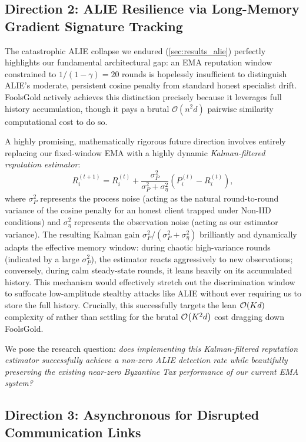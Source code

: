 \documentclass[../main.tex]{subfiles}
\begin{document}
\subsection{Direction 2: ALIE Resilience via Long-Memory Gradient Signature Tracking}
\label{sec:future_alie}

The catastrophic ALIE collapse we endured (\cref{sec:results_alie}) perfectly highlights our fundamental architectural gap: an EMA reputation window constrained to $1/(1-\gamma) = 20$ rounds is hopelessly insufficient to distinguish ALIE's moderate, persistent cosine penalty from standard honest specialist drift. FoolsGold actively achieves this distinction precisely because it leverages full history accumulation, though it pays a brutal $\mathcal{O}(n^2 d)$ pairwise similarity computational cost to do so.

A highly promising, mathematically rigorous future direction involves entirely replacing our fixed-window EMA with a highly dynamic \emph{Kalman-filtered reputation estimator}:
\begin{equation}
    R_i^{(t+1)} = R_i^{(t)} + \frac{\sigma_P^2}{\sigma_P^2 + \sigma_\eta^2}\left(P_i^{(t)} - R_i^{(t)}\right),
    \label{eq:future_kalman}
\end{equation}
where $\sigma_P^2$ represents the process noise (acting as the natural round-to-round variance of the cosine penalty for an honest client trapped under Non-IID conditions) and $\sigma_\eta^2$ represents the observation noise (acting as our estimator variance). The resulting Kalman gain $\sigma_P^2/(\sigma_P^2 + \sigma_\eta^2)$ brilliantly and dynamically adapts the effective memory window: during chaotic high-variance rounds (indicated by a large $\sigma_P^2$), the estimator reacts aggressively to new observations; conversely, during calm steady-state rounds, it leans heavily on its accumulated history. This mechanism would effectively stretch out the discrimination window to suffocate low-amplitude stealthy attacks like ALIE without ever requiring us to store the full history. Crucially, this successfully targets the lean $\mathcal{O}\!\left(K d\right)$ complexity of \aegis{} rather than settling for the brutal $\mathcal{O}\!\left(K^2 d\right)$ cost dragging down FoolsGold.

We pose the research question: \emph{does implementing this Kalman-filtered reputation estimator successfully achieve a non-zero ALIE detection rate while beautifully preserving the existing near-zero Byzantine Tax performance of our current EMA system?}

\subsection{Direction 3: Asynchronous \aegis{} for Disrupted Communication Links}
\label{sec:future_async}
\end{document}
